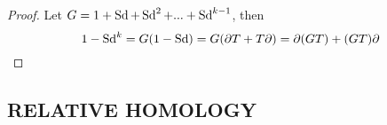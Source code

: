 \documentclass{report}
\begin{document}
\begin{proof}
    Let $G = 1 + \operatorname{Sd} + \operatorname{Sd}^2 + ... + \operatorname{Sd}^{k-1}$, then
    $$
        1 - \operatorname{Sd}^k = G (1 - \operatorname{Sd}) = G(\partial T + T \partial) = \partial (GT) + (GT) \partial
    $$
\end{proof}

\begin{theorem}
    
\end{theorem}

\begin{longproof}
\end{longproof}

\subsection{RELATIVE HOMOLOGY}
\end{document}
